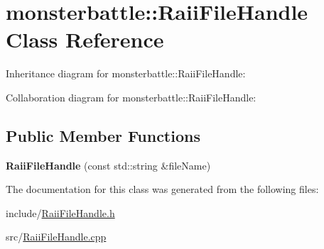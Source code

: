 \hypertarget{classmonsterbattle_1_1RaiiFileHandle}{}\section{monsterbattle\+:\+:Raii\+File\+Handle Class Reference}
\label{classmonsterbattle_1_1RaiiFileHandle}


Inheritance diagram for monsterbattle\+:\+:Raii\+File\+Handle\+:


Collaboration diagram for monsterbattle\+:\+:Raii\+File\+Handle\+:
\subsection*{Public Member Functions}
\begin{DoxyCompactItemize}
\item 
\mbox{\label{classmonsterbattle_1_1RaiiFileHandle_ac4878354da0a1dbf90b2123b417ab994}} 
{\bfseries Raii\+File\+Handle} (const std\+::string \&file\+Name)
\end{DoxyCompactItemize}


The documentation for this class was generated from the following files\+:\begin{DoxyCompactItemize}
\item 
include/\hyperlink{RaiiFileHandle_8h}{Raii\+File\+Handle.\+h}\item 
src/\hyperlink{RaiiFileHandle_8cpp}{Raii\+File\+Handle.\+cpp}\end{DoxyCompactItemize}
